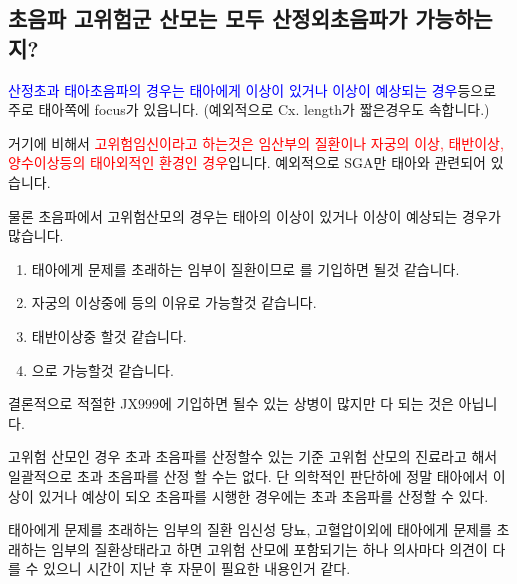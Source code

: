 \subsection{초음파 고위험군 산모는 모두 산정외초음파가 가능하는지?}
\textcolor{blue}{산정초과 태아초음파의 경우는 태아에게 이상이 있거나 이상이 예상되는 경우}등으로 주로 태아쪽에 focus가 있읍니다. (예외적으로 Cx. length가 짧은경우도 속합니다.) \par
거기에 비해서 \textcolor{red}{고위험임신이라고 하는것은 임산부의 질환이나 자궁의 이상, 태반이상, 양수이상등의 태아외적인 환경인 경우}입니다. 예외적으로 SGA만 태아와 관련되어 있습니다. \par
물론 초음파에서 고위험산모의 경우는 태아의 이상이 있거나 이상이 예상되는 경우가 많습니다. 
\begin{enumerate}[1.]\tightlist
\item 태아에게 문제를 초래하는 임부이 질환이므로 를 기입하면 될것 같습니다.
\item 자궁의 이상중에 등의 이유로 가능할것 같습니다.
\item 태반이상중 할것 같습니다. 
\item {}으로 가능할것 같습니다. 
\end{enumerate}
결론적으로 적절한 JX999에 기입하면 될수 있는 상병이 많지만 다 되는 것은 아닙니다.
\begin{commentbox}{고위험 산모인 경우 초과 초음파를 산정할수 있는 기준}
고위험 산모의 진료라고 해서 일괄적으로 초과 초음파를 산정 할 수는 없다. 단 의학적인 판단하에 정말 태아에서 이상이 있거나 예상이 되오 초음파를 시행한 경우에는 초과 초음파를 산정할 수 있다.
\end{commentbox}
\begin{commentbox}{태아에게 문제를 초래하는 임부의 질환}
임신성 당뇨, 고혈압이외에 태아에게 문제를 초래하는 임부의 질환상태라고 하면 고위험 산모에 포함되기는 하나 의사마다 의견이 다를 수 있으니 시간이 지난 후 자문이 필요한 내용인거 같다.
\end{commentbox}
